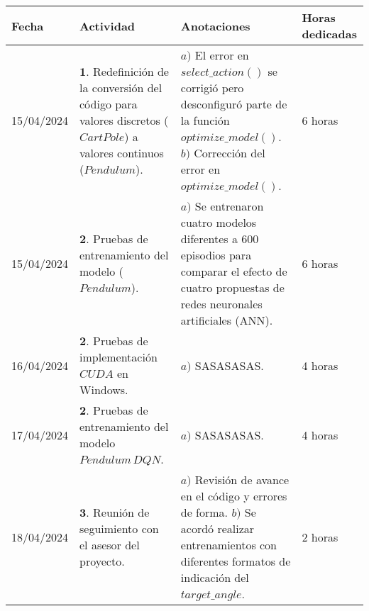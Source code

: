 \documentclass[12pt]{article}
\begin{document}
\begin{minipage}[h]{\textwidth}
	\centering
	\begin{tabularx}{\textwidth}{|p{2cm}|X|X|p{2cm}|} 
		\hline
		\rowcolor{encabezado}
		\textbf{Fecha} & 
		\textbf{Actividad} & 
		\textbf{Anotaciones} & 
		\textbf{Horas dedicadas} \\ \hline
	 	15/04/2024 & 
	 	$\mathbf{1}.$ Redefinición de la conversión del código para valores discretos ($CartPole$) a valores continuos ($Pendulum$). & 
	 	$a)$ El error en $select\_ action()$ se corrigió pero desconfiguró parte de la función $optimize\_ model()$. \newline
	 	$b)$ Corrección del error en $optimize\_ model()$. \newline & 
	 	6 horas \\
	 	15/04/2024 & 
	 	$\mathbf{2}.$ Pruebas de entrenamiento del modelo ($Pendulum$). & 
	 	$a)$ Se entrenaron cuatro modelos diferentes a $600$ episodios para comparar el efecto de cuatro propuestas de redes neuronales artificiales (ANN). \newline & 
	 	6 horas \\
		16/04/2024 & 
	 	$\mathbf{2}.$ Pruebas de implementación $CUDA$ en Windows. &
	 	$a)$ SASASASAS. \newline & 
	 	4 horas \\
		17/04/2024 & 
	 	$\mathbf{2}.$ Pruebas de entrenamiento del modelo $Pendulum\, DQN$. &
	 	$a)$ SASASASAS. \newline & 
	 	4 horas \\
	 	18/04/2024 & 
	 	$\mathbf{3}.$ Reunión de seguimiento con el asesor del proyecto. & 
	 	$a)$ Revisión de avance en el código y errores de forma.  \newline
	 	$b)$ Se acordó realizar entrenamientos con diferentes formatos de indicación del $target\_angle$.  \newline & 
	 	2 horas \\
	 	\hline
	\end{tabularx}
\end{minipage}	 	
	 	
\end{document}
